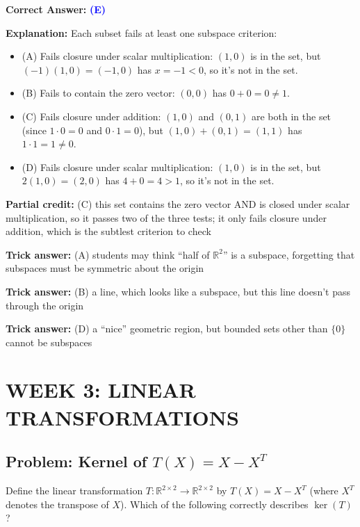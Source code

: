 \documentclass[12pt]{amsart}
\begin{document}
\textbf{Correct Answer:} \textcolor{blue}{\textbf{(E)}}

\textbf{Explanation:} Each subset fails at least one subspace criterion:
\begin{itemize}
\item (A) Fails closure under scalar multiplication: $(1, 0)$ is in the set, but $(-1)(1, 0) = (-1, 0)$ has $x = -1 < 0$, so it's not in the set.
\item (B) Fails to contain the zero vector: $(0, 0)$ has $0 + 0 = 0 \neq 1$.
\item (C) Fails closure under addition: $(1, 0)$ and $(0, 1)$ are both in the set (since $1 \cdot 0 = 0$ and $0 \cdot 1 = 0$), but $(1, 0) + (0, 1) = (1, 1)$ has $1 \cdot 1 = 1 \neq 0$.
\item (D) Fails closure under scalar multiplication: $(1, 0)$ is in the set, but $2(1, 0) = (2, 0)$ has $4 + 0 = 4 > 1$, so it's not in the set.
\end{itemize}

\textbf{Partial credit:} (C) this set contains the zero vector AND is closed under scalar multiplication, so it passes two of the three tests; it only fails closure under addition, which is the subtlest criterion to check

\textbf{Trick answer:} (A) students may think ``half of $\mathbb{R}^2$'' is a subspace, forgetting that subspaces must be symmetric about the origin

\textbf{Trick answer:} (B) a line, which looks like a subspace, but this line doesn't pass through the origin

\textbf{Trick answer:} (D) a ``nice'' geometric region, but bounded sets other than $\{0\}$ cannot be subspaces

\newpage

\section*{WEEK 3: LINEAR TRANSFORMATIONS}

\subsection*{Problem: Kernel of $T(X) = X - X^T$}

Define the linear transformation $T: \mathbb{R}^{2 \times 2} \to \mathbb{R}^{2 \times 2}$ by $T(X) = X - X^T$ (where $X^T$ denotes the transpose of $X$). Which of the following correctly describes $\ker(T)$?
\end{document}
